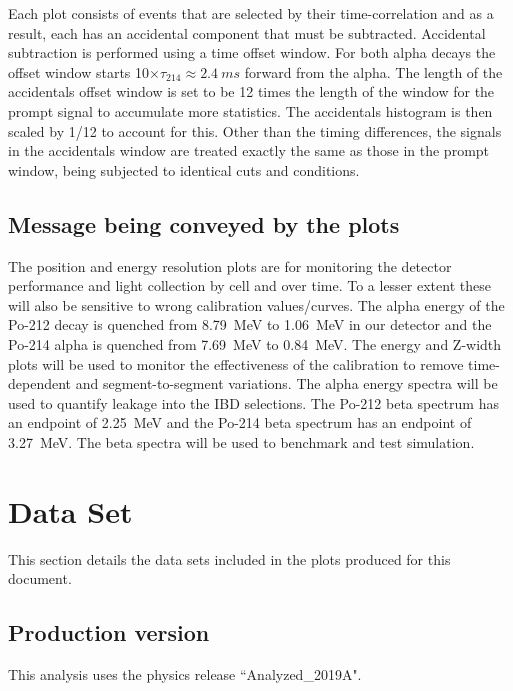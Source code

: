 Each plot consists of events that are selected by their time-correlation and as a result, each has an accidental component that must be subtracted. Accidental subtraction is performed using a time offset window. For both alpha decays the offset window starts 10$\times\tau_{214}\approx2.4~ms$ forward from the alpha. The length of the accidentals offset window is set to be 12 times the length of the window for the prompt signal to accumulate more statistics. The accidentals histogram is then scaled by 1/12 to account for this. Other than the timing differences, the signals in the accidentals window are treated exactly the same as those in the prompt window, being subjected to identical cuts and conditions.

\subsection{Message being conveyed by the plots}
The position and energy resolution plots are for monitoring the detector performance and light collection by cell and over time. To a lesser extent these will also be sensitive to wrong calibration values/curves. The alpha energy of the Po-212 decay is quenched from 8.79~MeV to 1.06~MeV in our detector and the Po-214 alpha is quenched from 7.69~MeV to 0.84~MeV. The energy and Z-width plots will be used to monitor the effectiveness of the calibration to remove time-dependent and segment-to-segment variations. The alpha energy spectra will be used to quantify leakage into the IBD selections. The Po-212 beta spectrum has an endpoint of 2.25~MeV and the Po-214 beta spectrum has an endpoint of 3.27~MeV. The beta spectra will be used to benchmark and test simulation.

\section{Data Set}
This section details the data sets included in the plots produced for this document.
\subsection{Production version}
This analysis uses the physics release ``Analyzed\_2019A".
